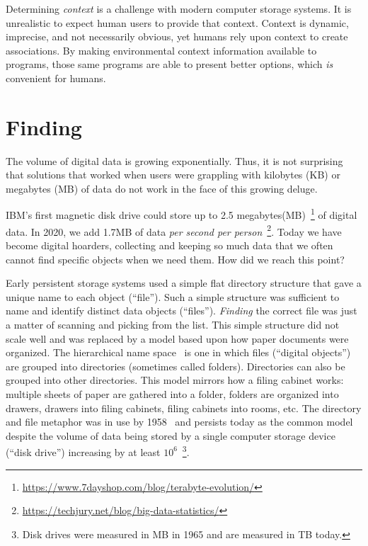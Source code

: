 Determining \emph{context} is a challenge with modern computer storage systems.
It is unrealistic to expect human users to provide that context.
Context is dynamic, imprecise, and not necessarily obvious, yet humans rely
upon context to create associations. By making environmental context information
available to programs, those same programs are able to present better options,
which \emph{is} convenient for humans.



\section{Finding}
\label{ch:intro:sec:finding}

The volume of digital data is growing exponentially. Thus, it is not surprising
that solutions that worked when users were grappling with kilobytes (KB) or megabytes
(MB) of data do not work in the face of this growing deluge.

IBM's first magnetic disk drive could store up to 2.5
megabytes(MB)~\footnote{\url{https://www.7dayshop.com/blog/terabyte-evolution/}}
of digital data.  In 2020, we add 1.7MB of data \emph{per second per
    person}~\footnote{\url{https://techjury.net/blog/big-data-statistics/}}.  Today
we have become digital hoarders, collecting and keeping so much data that we often
cannot find specific objects when we need them.  How did we reach this point?

Early persistent storage systems used a simple flat directory structure
that gave a unique name to each object (``file'').  Such a simple structure was sufficient
to  name and identify distinct data objects (``files'').
\emph{Finding} the correct file was just a matter of scanning and picking from
the list.  This simple
structure did not scale well and was replaced by
a model based upon how paper documents were organized.
The hierarchical name
space~\cite{barnard1958,daley1965general,ritchie1973unix,Saltzer1978} is one in
which files (``digital objects'') are grouped into directories (sometimes called
folders).  Directories can also be grouped into other directories.  This model
mirrors how a filing cabinet works: multiple sheets of paper are gathered into a
folder, folders are organized into drawers, drawers into filing cabinets, filing
cabinets into rooms, etc. The directory and file metaphor was in use by
1958~\cite{barnard1958} and persists today as the common model despite the
volume of data being stored by a single computer storage device (``disk drive'') increasing by at least $10^6$~\footnote{Disk
    drives were measured in MB in 1965 and are measured in TB today.}.

